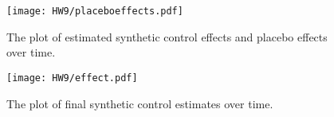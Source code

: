 \documentclass{article}
\begin{document}
\begin{enumerate}
\begin{figure}[H]
    \centering
\texttt{[image: HW9/placeboeffects.pdf]}{}
    \caption{The plot of estimated synthetic control effects and placebo effects over time.}
    \label{fig:enter-label}
\end{figure}

\begin{figure}[H]
    \centering
\texttt{[image: HW9/effect.pdf]}{}
    \caption{The plot of final synthetic control estimates over time.}
    \label{fig:enter-label}
\end{figure}
\end{enumerate} 
   
 
\end{document}
